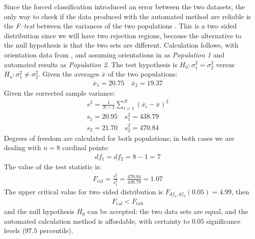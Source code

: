             Since the forced classification introduced an error between the two datasets, the only way to check if the data produced with the automated method are reliable is the \emph{F--test} between the variances of the two populations \cite[p.~53]{troi2010statistical}. This is a two--sided distribution since we will have two rejection regions, because the alternative to the null hypothesis is that the two sets are different. Calculation follows, with orientation data from , and assuming orientations in \cite{laterza} as \emph{Population 1} and automated results as \emph{Population 2}. The test hypothesis is $H_0 : \sigma^2_1 = \sigma^2_2$ versus $H_a : \sigma^2_1\neq\sigma^2_2$. Given the averages $\overline{x}$ of the two populations:
            \begin{align}\label{eq:ftest-m}
                \overline{x}_1 = 20.75\quad \overline{x}_2 = 19.37
            \end{align}
            Given the corrected sample variance:
            \begin{align}\label{eq:ftest-s}
                s^2 = \frac{1}{N-1} \sum_{i=1}^N (x_i - \overline{x})^2\\
                s_1 = 20.95\quad s^2_{1} = 438.79\nonumber\\
                s_2 = 21.70\quad s^2_{2} = 470.84
            \end{align}
            Degrees of freedom are calculated for both populations; in both cases we are dealing with $n=8$ cardinal points:
            \begin{align}\label{eq:f-test-degree}
                df_1 = df_2 = 8-1 = 7
            \end{align}
            The value of the test statistic is:
            \begin{align}
                \label{eq:ftest-f}
                F_{\text{cal}} = \frac{s^2_2}{s^2_1} = \frac{470.84}{438.79} = 1.07
            \end{align}
            The upper critical value for two--sided distribution is $F_{df_1, df_2}(0.05)=4.99$, then
            \begin{align}
                \label{eq:f-test-prove}
                F_{\text{cal}} < F_{\text{tab}}\nonumber
            \end{align}
            and the null hypothesis $H_0$ can be accepted: the two data sets are equal, and the automated calculation method is affordable, with certainty to $0.05$ significance levels ($97.5$ percentile).

